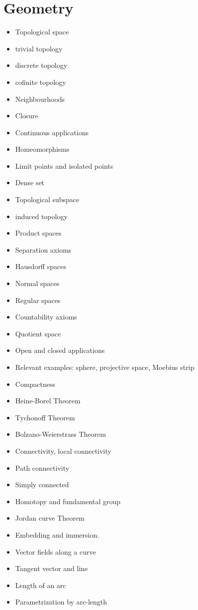 \documentclass[10pt]{article}
\begin{document}
\section{Geometry}
\begin{itemize}
	\item Topological space
	\item trivial topology
	\item discrete topology
	\item cofinite topology
	\item Neighbourhoods
	\item Closure
	\item Continuous applications
	\item Homeomorphisms
	\item Limit points and isolated points
	\item Dense set
	\item Topological subspace
	\item induced topology
	\item Product spaces
	\item Separation axioms
	\item Hausdorff spaces
	\item Normal spaces
	\item Regular spaces
	\item Countability axioms
	\item Quotient space
	\item Open and closed applications
	\item Relevant examples: sphere, projective space, Moebius strip
	\item Compactness
	\item Heine-Borel Theorem
	\item Tychonoff Theorem
	\item Bolzano-Weierstrass Theorem
	\item Connectivity, local connectivity
	\item Path connectivity
	\item Simply connected
	\item Homotopy and fundamental group
	\item Jordan curve Theorem
	\item Embedding and immersion. 
	\item Vector fields along a curve
	\item Tangent vector and line
	\item Length of an arc
	\item Parametrization by arc-length

\end{itemize}
\end{document}
